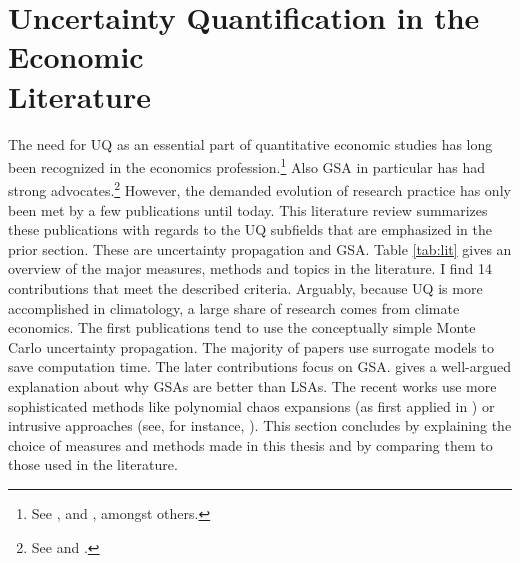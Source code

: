 \section{Uncertainty Quantification in the Economic \\ Literature}
\thispagestyle{plain} %

The need for UQ as an essential part of quantitative economic studies has long been recognized in the economics profession.\footnote{See \cite{Hansen.1996}, \cite{Kydland.1992} and \cite{Canova.1994}, amongst others.} Also GSA in particular has had strong advocates.\footnote{See \cite{Canova.1995} and \cite{Gregory.1995}.} However, the demanded evolution of research practice has only been met by a few publications until today. This literature review summarizes these publications with regards to the UQ subfields that are emphasized in the prior section. These are uncertainty propagation and GSA. Table \ref{tab:lit} gives an overview of the major measures, methods and topics in the literature. I find 14 contributions that meet the described criteria. Arguably, because UQ is more accomplished in climatology, a large share of research comes from climate economics. The first publications tend to use the conceptually simple Monte Carlo uncertainty propagation.  The majority of papers use surrogate models to save computation time. The later contributions focus on GSA. \cite{Harenberg.2019} gives a well-argued explanation about why GSAs are better than LSAs. The recent works use more sophisticated methods like polynomial chaos expansions (as first applied in \cite{Harenberg.2019}) or intrusive approaches (see, for instance, \cite{Scheidegger.2019}). This section concludes by explaining the choice of measures and methods made in this thesis and by comparing them to those used in the literature.



